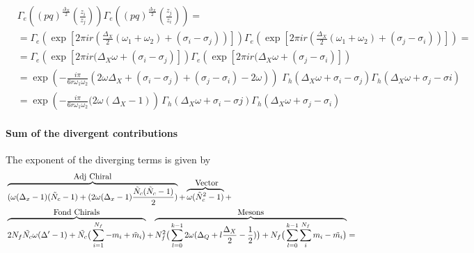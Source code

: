 \begin{appendices}
 \begin{equation}
 \begin{aligned}
 & \Gamma_e \left( (pq)^{\frac{\Delta_X}{2}} \left( \frac{ z_i}{ z_j} \right) \right) \Gamma_e \left( (pq)^{\frac{\Delta_X}{2}} \left( \frac{ z_j}{z_i} \right) \right) = \\
&= \Gamma_e\left( \exp \left[ 2 \pi i r \left( \frac{\Delta_X}{2} (\omega_1 + \omega_2) +  (\sigma_i - \sigma_j) \right) \right] \right) 
 \Gamma_e \left( \exp \left[ 2 \pi i r \left( \frac{\Delta_X}{2} (\omega_1 + \omega_2) +  (\sigma_j - \sigma_i) \right) \right] \right)=  \\
&= \Gamma_e \left( \exp \left[2 \pi  i r (\Delta_X \omega + (\sigma_i - \sigma_j ) \right] \right) \Gamma_e \left(  \exp \left[ 2 \pi  i r (\Delta_X \omega + (\sigma_j - \sigma_i )\right] \right) \\
 & = \exp \left( {- \frac{i \pi} {6 r \omega_1 \omega_2 }  ( 2 \omega \Delta_X + (\sigma_i - \sigma_j)+(\sigma_j - \sigma_i) - 2 \omega) }\right)\, \, \Gamma_h ( \Delta_X \omega + \sigma_i - \sigma_j ) \Gamma_h ( \Delta_X \omega + \sigma_j - \sigma i) \\
 & = \exp\left({- \frac{i \pi} {6 r \omega_1 \omega_2 }  ( 2 \omega (\Delta_X - 1) }\right)  \, \Gamma_h ( \Delta_X \omega + \sigma_i - \sigma j ) \Gamma_h ( \Delta_X \omega + \sigma_j - \sigma_i)
\end{aligned}
\end{equation}

\paragraph{Sum of the divergent contributions}
The exponent of the diverging terms is given by
\begin{equation}
\begin{aligned}
&   \overbrace{ ( \omega (\Delta_x - 1)(\tilde { N}_c - 1) + ( 2 \omega (\Delta_x - 1)\frac{\tilde { N}_c(\tilde{ N}_c-1)}{2}) }^{ \hbox{Adj Chiral}} +  \overbrace{ \omega (\tilde{N}_c^2 - 1)}^{\hbox{ Vector}} +\\
& \overbrace{2  N_f \tilde{N_c}\omega (\Delta' - 1 ) +  \tilde{N_c} \big( \sum_{i=1}^{N_f} - m_i + \tilde{m}_i \big) }^{\hbox{Fond Chirals}} +  \overbrace{ N_f^2 \big(  \sum _{l=0}^{k-1} 2 \omega ( \Delta_Q + l \frac{\Delta_X}{2} - \frac{1}{2} ) \big)  + N_f \big( \sum_{l=0}^{k-1} \sum_i^{N_f} m_i - \tilde{m_i} \big)}^{\hbox{Mesons}} = \\
\end{aligned}
\end{equation}


\end{appendices}
